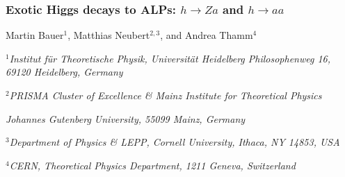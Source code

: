 \subsubsection{Exotic Higgs decays to ALPs: $h \to Za$ and $h \to aa$}
\begin{center}
 {Martin Bauer$^{1}$, Matthias Neubert$^{2,3}$, and Andrea Thamm$^{4}$\\
}

\vspace{2mm}
\centerline{{\it $^{1}$Institut f\"ur Theoretische Physik, Universit\"at Heidelberg
Philosophenweg 16, 69120 Heidelberg, Germany}}
\centerline{{\it  $^{2}$PRISMA Cluster of Excellence \& Mainz Institute for Theoretical Physics}}
\centerline{{\it Johannes Gutenberg University, 55099 Mainz, Germany}}
\centerline{{\it  $^{3}$Department of Physics \& LEPP, Cornell University, Ithaca, NY 14853, USA}}
\centerline{{\it  $^{4}$CERN, Theoretical Physics Department, 1211 Geneva, Switzerland}}
\end{center}

